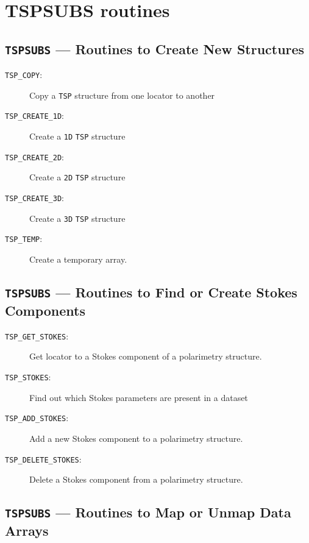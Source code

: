 \documentclass[11pt,twoside,nolof,noabs]{starlink}
\newcommand{\mansection}[2]{\subsection{#1 --- #2}}
\newenvironment{mansectionroutines}{\begin{description}}{\end{description}}
\newcommand{\mansectionitem}[1]{\item[#1:]}
\providecommand{\mantt}[1]{\texttt{#1}}
\begin{document}
\newpage

\section{TSPSUBS routines}

\mansection{{\mantt{TSPSUBS}}}{Routines to Create New Structures}
\begin{mansectionroutines}
\mansectionitem{{\mantt{TSP\_{}COPY}}}
     Copy a {\mantt{TSP}} structure from one locator to another

\mansectionitem{{\mantt{TSP\_{}CREATE\_{}1D}}}
     Create a {\mantt{1D}} {\mantt{TSP}} structure

\mansectionitem{{\mantt{TSP\_{}CREATE\_{}2D}}}
     Create a {\mantt{2D}} {\mantt{TSP}} structure

\mansectionitem{{\mantt{TSP\_{}CREATE\_{}3D}}}
     Create a {\mantt{3D}} {\mantt{TSP}} structure

\mansectionitem{{\mantt{TSP\_{}TEMP}}}
     Create a temporary array.

\end{mansectionroutines}
\mansection{{\mantt{TSPSUBS}}}{Routines to Find or Create Stokes Components}
\begin{mansectionroutines}
\mansectionitem{{\mantt{TSP\_{}GET\_{}STOKES}}}
     Get locator to a Stokes component of a polarimetry structure.

\mansectionitem{{\mantt{TSP\_{}STOKES}}}
     Find out which Stokes parameters are present in a dataset

\mansectionitem{{\mantt{TSP\_{}ADD\_{}STOKES}}}
     Add a new Stokes component to a polarimetry structure.

\mansectionitem{{\mantt{TSP\_{}DELETE\_{}STOKES}}}
     Delete a Stokes component from a polarimetry structure.

\end{mansectionroutines}
\mansection{{\mantt{TSPSUBS}}}{Routines to Map or Unmap Data Arrays}
\end{document}
